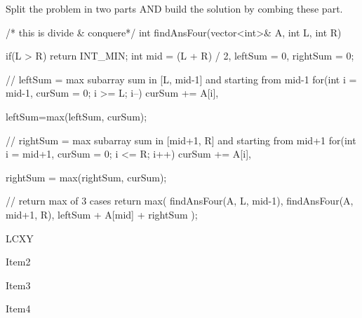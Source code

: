     

\begin{solution}
    Split the problem in two parts AND build the solution by combing these part.
    
    \begin{code}
    /* this is divide & conquere*/
    int findAnsFour(vector<int>& A, int L, int R){
        if(L > R) return INT_MIN;
        int mid = (L + R) / 2, leftSum = 0, rightSum = 0;

        // leftSum = max subarray sum in [L, mid-1] and starting from mid-1
        for(int i = mid-1, curSum = 0; i >= L; i--)
            curSum += A[i],
        
        leftSum=max(leftSum, curSum);

        // rightSum = max subarray sum in [mid+1, R] and starting from mid+1
        for(int i = mid+1, curSum = 0; i <= R; i++)
            curSum += A[i],
        
        rightSum = max(rightSum, curSum);        

        // return max of 3 cases 
        return max({ findAnsFour(A, L, mid-1), findAnsFour(A, mid+1, R), leftSum + A[mid] + rightSum });
    }	
    \end{code}
\end{solution}


\begin{pratice}

\begin{asparaenum}[(a)]
    \item LCXY
    \item Item2
    \item Item3
    \item Item4
    \item \lipsum[1]
\end{asparaenum}

\end{pratice}